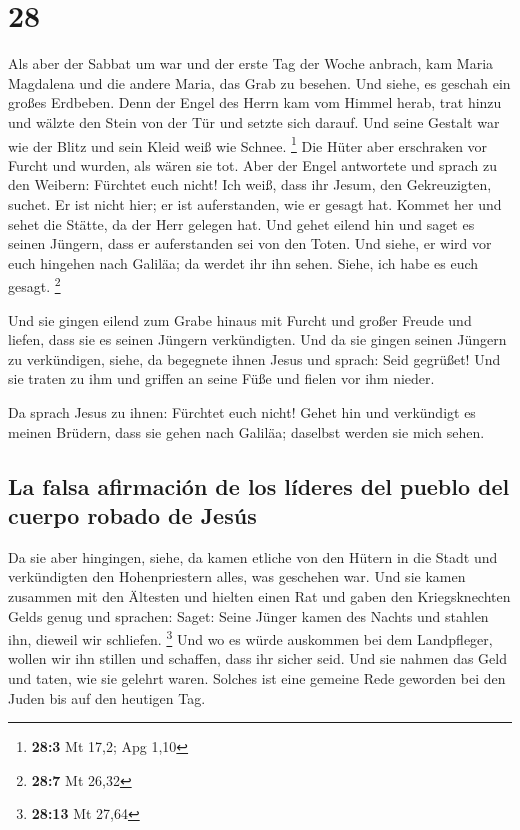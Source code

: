 \hypertarget{section-27}{%
\section{28}\label{section-27}}

 Als aber der Sabbat um war und der erste Tag der Woche
anbrach, kam Maria Magdalena und die andere Maria, das Grab zu besehen.
 Und siehe, es geschah ein großes Erdbeben. Denn der Engel
des Herrn kam vom Himmel herab, trat hinzu und wälzte den Stein von der
Tür und setzte sich darauf.  Und seine Gestalt war wie der
Blitz und sein Kleid weiß wie Schnee. \footnote{\textbf{28:3} Mt 17,2;
  Apg 1,10}  Die Hüter aber erschraken vor Furcht und
wurden, als wären sie tot.  Aber der Engel antwortete und
sprach zu den Weibern: Fürchtet euch nicht! Ich weiß, dass ihr Jesum,
den Gekreuzigten, suchet.  Er ist nicht hier; er ist
auferstanden, wie er gesagt hat. Kommet her und sehet die Stätte, da der
Herr gelegen hat.  Und gehet eilend hin und saget es
seinen Jüngern, dass er auferstanden sei von den Toten. Und siehe, er
wird vor euch hingehen nach Galiläa; da werdet ihr ihn sehen. Siehe, ich
habe es euch gesagt. \footnote{\textbf{28:7} Mt 26,32}

 Und sie gingen eilend zum Grabe hinaus mit Furcht und
großer Freude und liefen, dass sie es seinen Jüngern verkündigten. Und
da sie gingen seinen Jüngern zu verkündigen,  siehe, da
begegnete ihnen Jesus und sprach: Seid gegrüßet! Und sie traten zu ihm
und griffen an seine Füße und fielen vor ihm nieder.

 Da sprach Jesus zu ihnen: Fürchtet euch nicht! Gehet hin
und verkündigt es meinen Brüdern, dass sie gehen nach Galiläa; daselbst
werden sie mich sehen.

\hypertarget{la-falsa-afirmaciuxf3n-de-los-luxedderes-del-pueblo-del-cuerpo-robado-de-jesuxfas}{%
\subsection{La falsa afirmación de los líderes del pueblo del cuerpo
robado de
Jesús}\label{la-falsa-afirmaciuxf3n-de-los-luxedderes-del-pueblo-del-cuerpo-robado-de-jesuxfas}}

 Da sie aber hingingen, siehe, da kamen etliche von den
Hütern in die Stadt und verkündigten den Hohenpriestern alles, was
geschehen war.  Und sie kamen zusammen mit den Ältesten
und hielten einen Rat und gaben den Kriegsknechten Gelds genug
 und sprachen: Saget: Seine Jünger kamen des Nachts und
stahlen ihn, dieweil wir schliefen. \footnote{\textbf{28:13} Mt 27,64}
 Und wo es würde auskommen bei dem Landpfleger, wollen
wir ihn stillen und schaffen, dass ihr sicher seid.  Und
sie nahmen das Geld und taten, wie sie gelehrt waren. Solches ist eine
gemeine Rede geworden bei den Juden bis auf den heutigen Tag.

